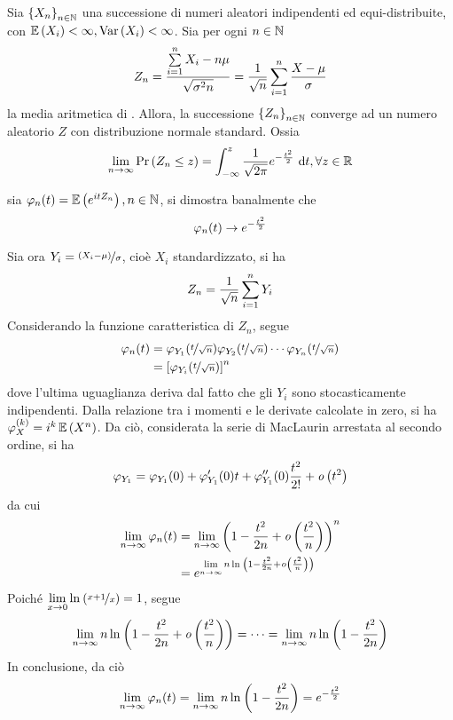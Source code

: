 \documentclass{subfiles}
\begin{document}
\begin{Theorem*}
    Sia \(\Sequence{X_{n}}\) una successione di numeri aleatori indipendenti ed equi-distribuite, con \(\Expected{X_{i}} < \infty, \Var{X_{i}} < \infty\).
    Sia per ogni \(n \in \operatorname{\mathbb{N}}\)
    \[
        Z_{n} = \Frac{\Sum{X_{i} - n\mu}{i = 1}[n]}{\sqrt{\sigma^{2} n}} = \Frac{1}{\sqrt{n}} \Sum{\Frac{X - \mu}{\sigma}}{i = 1}[n]
    \]
    la media aritmetica di .
    Allora, la successione \(\Sequence{Z_{n}}\) converge ad un numero aleatorio \(Z\) con distribuzione normale standard.
    Ossia
    \[
        \Lim{n}{\infty}{\Prob{Z_{n} \le z}} = \Int{\Frac{1}{\sqrt{2\pi}} e^{-\Frac{t^{2}}{2}}}{t}[-\infty][z], \forall z \in \Real
    \]
    \begin{Proof*}
        sia \(\varphi_{n}(t) = \Expected{e^{itZ_{n}}}, n \in \Natural\), si dimostra banalmente che
        \[
            \varphi_{n}(t) \to e^{-\Frac{t^{2}}{2}}
        \]

        Sia ora \(Y_{i} = \Frac*{(X_{i} - \mu)}{\sigma}\), cioè \(X_{i}\) standardizzato, si ha
        \[
            Z_{n} = \Frac{1}{\sqrt{n}} \Sum{Y_{i}}{i = 1}[n]
        \]
        Considerando la funzione caratteristica di \(Z_{n}\), segue
        \[\begin{aligned}
                \varphi_{n}(t) & = \varphi_{Y_{1}}(\Frac*{t}{\sqrt{n}}) \varphi_{Y_{2}}(\Frac*{t}{\sqrt{n}}) \cdots \varphi_{Y_{n}}(\Frac*{t}{\sqrt{n}}) \\
                               & = \left[ \varphi_{Y_{i}}(\Frac*{t}{\sqrt{n}}) \right]^{n}
            \end{aligned}\]
        dove l'ultima uguaglianza deriva dal fatto che gli \(Y_{i}\) sono stocasticamente indipendenti.
        Dalla relazione tra i momenti e le derivate calcolate in zero, si ha \(\varphi_{X}^{(k)} = i^{k} \Expected{X^{n}}\).
        Da ciò, considerata la serie di MacLaurin arrestata al secondo ordine, si ha
        \[
            \varphi_{Y_{1}} = \varphi_{Y_{1}}(0) + \varphi_{Y_{1}}'(0)t + \varphi_{Y_{1}}''(0) \Frac{t^{2}}{2!} + \LittleO{t^{2}}
        \]
        da cui
        \[\begin{aligned}
                \Lim{n}{\infty}{\varphi_{n}(t)} & = \Lim{n}{\infty}{\left(1 - \Frac{t^{2}}{2n} + \LittleO{\Frac{t^{2}}{n}}\right)^{n}} \\
                                                & = e^{\Lim{n}{\infty}{n \Log*{1 - \Frac{t^{2}}{2n} + \LittleO{\Frac{t^{2}}{n}}}}}
            \end{aligned}\]
        Poiché \(\Lim{x}{0}{\Log*{\Frac*{x + 1}{x}}} = 1\), segue
        \[
            \Lim{n}{\infty}{n \Log*{1 - \Frac{t^{2}}{2n} + \LittleO{\Frac{t^{2}}{n}}}} = \cdots = \Lim{n}{\infty}{n \Log*{1 - \Frac{t^{2}}{2n}}}
        \]
        In conclusione, da ciò
        \[
            \Lim{n}{\infty}{\varphi_{n}(t)} = \Lim{n}{\infty}{n \Log*{1 - \Frac{t^{2}}{2n}}} = e^{-\Frac{t^{2}}{2}}
        \]
    \end{Proof*}
\end{Theorem*}
\end{document}
